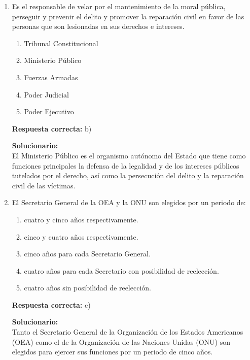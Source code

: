 \begin{enumerate}
	

	\vspace{2mm}	

	\item Es el responsable de velar por el mantenimiento de la moral pública, perseguir y prevenir el delito y promover la reparación civil en favor de las personas que son lesionadas en sus derechos e intereses.
	
	\begin{enumerate}[label=\alph*)]
		\item Tribunal Constitucional
		\item Ministerio Público
		\item Fuerzas Armadas
		\item Poder Judicial
		\item Poder Ejecutivo
	\end{enumerate}
	
	\textbf{Respuesta correcta:} b)
	
	\vspace{2mm}
	\textbf{Solucionario:}\\
	El Ministerio Público es el organismo autónomo del Estado que tiene como funciones principales la defensa de la legalidad y de los intereses públicos tutelados por el derecho, así como la persecución del delito y la reparación civil de las víctimas.
	
	\vspace{6mm}
	
	\item El Secretario General de la OEA y la ONU son elegidos por un periodo de:
	
	\begin{enumerate}[label=\alph*)]
		\item cuatro y cinco años respectivamente.
		\item cinco y cuatro años respectivamente.
		\item cinco años para cada Secretario General.
		\item cuatro años para cada Secretario con posibilidad de reelección.
		\item cuatro años sin posibilidad de reelección.
	\end{enumerate}
	
	\textbf{Respuesta correcta:} c)
	
	\vspace{2mm}
	\textbf{Solucionario:}\\
	
	Tanto el Secretario General de la Organización de los Estados Americanos (OEA) como el de la Organización de las Naciones Unidas (ONU) son elegidos para ejercer sus funciones por un periodo de cinco años.

	
	\vspace{6mm}
	
\end{enumerate}


